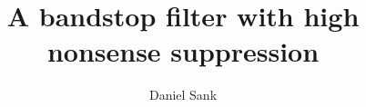 \documentclass[twocolumn]{article}
\title{A bandstop filter with high nonsense suppression}
\author{Daniel Sank}
\begin{document}
\begin{titlingpage}
  \maketitle
  
\end{titlingpage}

\tableofcontents





\end{document}

